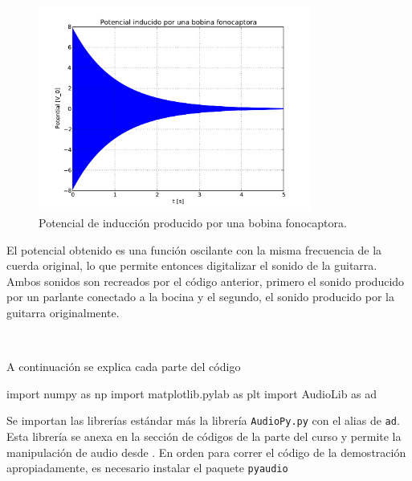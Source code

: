 \begin{figure}[htbp]
	\centering
	\includegraphics[width=0.8\textwidth]
	{./pictures/demo4_01.pdf}

	\caption{\small{Potencial de inducción producido por una bobina
	fonocaptora.}}
	
	\label{fig:fono_fem}
\end{figure}


El potencial obtenido es una función oscilante con la misma frecuencia de
la cuerda original, lo que permite entonces digitalizar el sonido de la 
guitarra. Ambos sonidos son recreados por el código anterior, primero el 
sonido producido por un parlante conectado a la bocina y el segundo, el
sonido producido por la guitarra originalmente.

\

A continuación se explica cada parte del código


\begin{listing}[style=python, numbers = none]
import numpy as np
import matplotlib.pylab as plt
import AudioLib as ad
\end{listing}
Se importan las librerías estándar más la librería \texttt{AudioPy.py} con
el alias de \texttt{ad}. Esta librería se anexa en la sección de códigos de
la parte del curso y permite la manipulación de audio desde \python. En 
orden para correr el código de la demostración apropiadamente, es 
necesario instalar el paquete \texttt{pyaudio}

